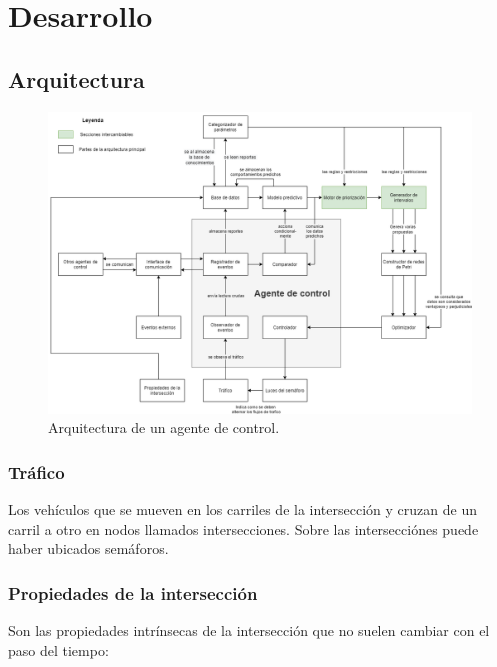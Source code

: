 
\chapter{Desarrollo} %
\graphicspath{{./../imagenes/}}
\linespread{1.3}
\hypertarget{arquitectura}{%
\section{Arquitectura}\label{arquitectura}}

\begin{figure}[H]
    \centering
\includegraphics[width=\textwidth]{arquitectura.png}
    \caption{Arquitectura de un agente de control.}
    \label{fig:arq1}
\end{figure}

\hypertarget{truxe1fico}{%
\subsection{Tráfico}\label{truxe1fico}}

Los vehículos que se mueven en los carriles de la intersección y cruzan
de un carril a otro en nodos llamados intersecciones. Sobre las
intersecciónes puede haber ubicados semáforos.

\hypertarget{propiedades-de-la-intersecciuxf3n}{%
\subsection{Propiedades de la
intersección}\label{propiedades-de-la-intersecciuxf3n}}

Son las propiedades intrínsecas de la intersección que no suelen cambiar
con el paso del tiempo:

